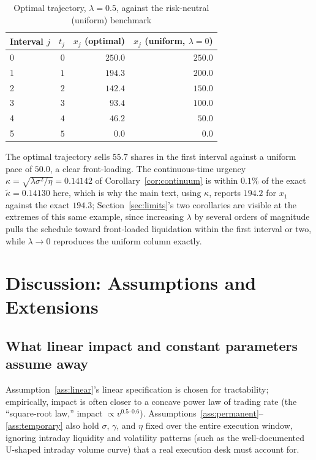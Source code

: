 \documentclass[11pt]{article}
\theoremstyle{remark}
\theoremstyle{definition}
\begin{document}
\begin{table}[htbp]
\centering
\caption{Optimal trajectory, $\lambda=0.5$, against the risk-neutral (uniform) benchmark}
\label{tab:traj}
\begin{tabular}{@{}lrrr@{}}
\toprule
Interval $j$ & $t_j$ & $x_j$ (optimal) & $x_j$ (uniform, $\lambda=0$) \\
\midrule
0 & $0$ & $250.0$ & $250.0$ \\
1 & $1$ & $194.3$ & $200.0$ \\
2 & $2$ & $142.4$ & $150.0$ \\
3 & $3$ & $93.4$ & $100.0$ \\
4 & $4$ & $46.2$ & $50.0$ \\
5 & $5$ & $0.0$ & $0.0$ \\
\bottomrule
\end{tabular}
\end{table}

The optimal trajectory sells $55.7$ shares in the first interval against a uniform pace of $50.0$, a clear front-loading. The continuous-time urgency $\kappa=\sqrt{\lambda\sigma^2/\eta}=0.14142$ of Corollary~\ref{cor:continuum} is within $0.1\%$ of the exact $\tilde\kappa=0.14130$ here, which is why the main text, using $\kappa$, reports $194.2$ for $x_1$ against the exact $194.3$; Section~\ref{sec:limits}'s two corollaries are visible at the extremes of this same example, since increasing $\lambda$ by several orders of magnitude pulls the schedule toward front-loaded liquidation within the first interval or two, while $\lambda\to0$ reproduces the uniform column exactly.

\section{Discussion: Assumptions and Extensions}
\label{sec:discussion}

\subsection{What linear impact and constant parameters assume away}
Assumption~\ref{ass:linear}'s linear specification is chosen for tractability; empirically, impact is often closer to a concave power law of trading rate (the ``square-root law,'' impact $\propto v^{0.5\text{--}0.6}$). Assumptions~\ref{ass:permanent}--\ref{ass:temporary} also hold $\sigma$, $\gamma$, and $\eta$ fixed over the entire execution window, ignoring intraday liquidity and volatility patterns (such as the well-documented U-shaped intraday volume curve) that a real execution desk must account for.
\end{document}
